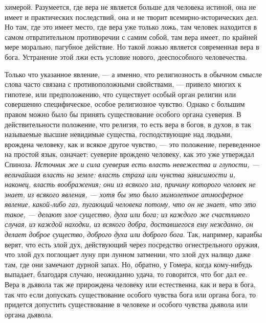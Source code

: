 \documentclass[12pt]{article}
\begin{document}
химерой. Разумеется, где вера не является больше для человека истиной, она не имеет и практических последствий, она и не творит всемирно-исторических дел. Но там, где это имеет место, где вера уже только ложь, там человек находится в самом отвратительном противоречии с самим собой, там вера имеет, по крайней мере морально, пагубное действие. Но такой ложью является современная вера в бога. Устранение этой лжи есть условие нового, дееспособного человечества. 

Только что указанное явление, --- а именно, что религиозность в обычном смысле слова часто связана с противоположными свойствами, --- привело многих к гипотезе, или предположению, что существует особый орган религии или совершенно специфическое, особое религиозное чувство. Однако с большим правом можно было бы принять существование особого органа суеверия. В действительности положение, что религия, то есть вера в богов, в духов, в так называемые высшие невидимые существа, господствующие над людьми, врождена человеку, как и всякое другое чувство, --- это положение, переведенное на простой язык, означает: суеверие врождено человеку, как это уже утверждал Спиноза. \emph{Источник же и сила суеверия есть власть невежества и глупости, --- величайшая власть на земле: власть страха или чувства зависимости и, наконец, власть воображения; они из всякого зла, причину которого человек не знает, из всякого явления, --- хотя бы это было мимолетное атмосферное явление, какой-либо газ, пугающий человека потому, что он не знает, что это такое, --- делают злое существо, духа или бога; из каждого же счастливого случая, из каждой находки, из всякого добра, доставшегося ему нежданно, он делает доброе существо, доброго духа или доброго бога}. Так, например, караибы верят, что есть злой дух, действующий через посредство огнестрельного оружия, что злой дух поглощает луну при лунном затмении, что злой дух налицо даже там, где они замечают дурной запах. Но, обратно, у Гомера, когда кому-нибудь выпадает, благодаря случаю, неожиданно удача, то говорится, что бог дал ее. Вера в дьявола так же прирождена человеку или естественна, как и вера в бога, так что если допускать существование особого чувства бога или органа бога, то придется допустить существование в человеке и особого чувства дьявола или органа дьявола. 
\end{document}
